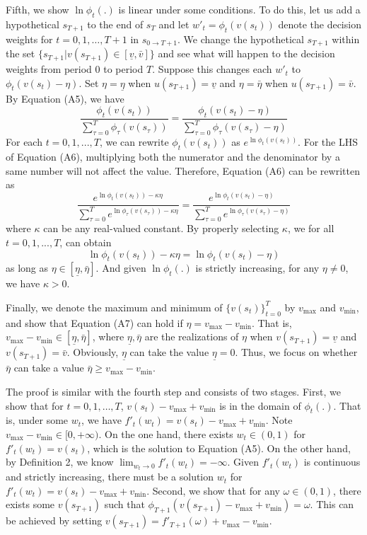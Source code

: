 \documentclass[
  12pt,
]{article}
\begin{document}
Fifth, we show \(\ln \phi_t(.)\) is linear under some conditions. To do
this, let us add a hypothetical \(s_{T+1}\) to the end of \(s_T\) and
let \(w'_t=\phi_t(v(s_t))\) denote the decision weights for
\(t=0,1,…,T+1\) in \(s_{0\rightarrow T+1}\). We change the hypothetical
\(s_{T+1}\) within the set
\(\{s_{T+1}|v(s_{T+1})\in[\underline{v},\bar{v}]\}\) and see what will
happen to the decision weights from period 0 to period \(T\). Suppose
this changes each \(w'_t\) to \(\phi_t(v(s_t)-\eta)\). Set
\(\eta=\underline{\eta}\) when \(u(s_{T+1})=\underline{v}\) and
\(\eta=\bar{\eta}\) when \(u(s_{T+1})=\bar{v}\). By Equation (A5), we
have\[\tag{A6}
\frac{\phi_t(v(s_t))}{\sum_{\tau=0}^{T}\phi_\tau(v(s_\tau))} = \frac{\phi_t(v(s_t)-\eta)}{\sum_{\tau=0}^{T}\phi_\tau(v(s_\tau)-\eta)}
\]For each \(t=0,1,...,T\), we can rewrite \(\phi_t(v(s_t))\) as
\(e^{\ln \phi_t(v(s_t))}\). For the LHS of Equation (A6), multiplying
both the numerator and the denominator by a same number will not affect
the value. Therefore, Equation (A6) can be rewritten as \[
\frac{e^{\ln\phi_t(v(s_t))-\kappa\eta}}{\sum_{\tau=0}^{T}e^{\ln\phi_\tau(v(s_\tau))-\kappa\eta}} = \frac{e^{\ln\phi_t(v(s_t)-\eta)}}{\sum_{\tau=0}^{T}e^{\ln\phi_\tau(v(s_\tau)-\eta)}}
\]where \(\kappa\) can be any real-valued constant. By properly
selecting \(\kappa\), we for all \(t=0,1,...,T\), can obtain\[\tag{A7}
\ln \phi_t(v(s_t))-\kappa\eta=\ln \phi_t(v(s_t)-\eta)
\]as long as \(\eta \in [\underline{\eta},\bar{\eta}]\). And given
\(\ln\phi_t(.)\) is strictly increasing, for any \(\eta\neq 0\), we have
\(\kappa>0\).

Finally, we denote the maximum and minimum of \(\{v(s_t)\}_{t=0}^T\) by
\(v_{\max}\) and \(v_{\min}\), and show that Equation (A7) can hold if
\(\eta = v_{\max} - v_{\min}\). That is,
\(v_{\max}-v_{\min}\in [\underline{\eta},\bar{\eta}]\), where
\(\underline{\eta}, \bar{\eta}\) are the realizations of \(\eta\) when
\(v(s_{T+1})=\underline{v}\) and \(v(s_{T+1})=\bar{v}\). Obviously,
\(\underline{\eta}\) can take the value \(\underline{\eta}=0\). Thus, we
focus on whether \(\bar{\eta}\) can take a value
\(\bar{\eta}\geq v_{\max}-v_{\min}\).

The proof is similar with the fourth step and consists of two stages.
First, we show that for \(t=0,1,…,T\), \(v(s_t)-v_{\max}+v_{\min}\) is
in the domain of \(\phi_t(.)\). That is, under some \(w_t\), we have
\(f'_t(w_t)=v(s_t)-v_{\max}+v_{\min}\). Note
\(v_{\max}-v_{\min}\in[0,+\infty)\). On the one hand, there exists
\(w_t\in(0,1)\) for \(f'_t(w_t)=v(s_t)\), which is the solution to
Equation (A5). On the other hand, by Definition 2, we know
\(\lim_{w_t\rightarrow 0}f'_t(w_t)=-\infty\). Given \(f'_t(w_t)\) is
continuous and strictly increasing, there must be a solution \(w_t\) for
\(f'_t(w_t)=v(s_t)-v_{\max}+v_{\min}\). Second, we show that for any
\(\omega\in(0,1)\), there exists some \(v(s_{T+1})\) such that
\(\phi_{T+1}(v(s_{T+1})-v_{\max}+v_{\min})=\omega\). This can be
achieved by setting \(v(s_{T+1})=f'_{T+1}(\omega)+v_{\max}-v_{\min}\).
\end{document}
